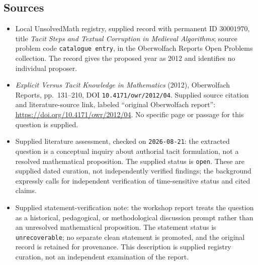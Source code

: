 \documentclass[11pt]{article}
\begin{document}
\subsection{Sources}
\begin{itemize}
\item Local UnsolvedMath registry, supplied record with permanent ID \(30001970\), title \emph{Tacit Steps and Textual Corruption in Medieval Algorithms}; source problem code \texttt{catalogue entry}, in the Oberwolfach Reports Open Problems collection. The record gives the proposed year as 2012 and identifies no individual proposer.
\item \emph{Explicit Versus Tacit Knowledge in Mathematics} (2012), Oberwolfach Reports, pp.\ 131--210, DOI \texttt{10.4171/owr/2012/04}. Supplied source citation and literature-source link, labeled ``original Oberwolfach report'': \url{https://doi.org/10.4171/owr/2012/04}. No specific page or passage for this question is supplied.
\item Supplied literature assessment, checked on \texttt{2026-08-21}: the extracted question is a conceptual inquiry about authorial tacit formulation, not a resolved mathematical proposition. The supplied status is \texttt{open}. These are supplied dated curation, not independently verified findings; the background expressly calls for independent verification of time-sensitive status and cited claims.
\item Supplied statement-verification note: the workshop report treats the question as a historical, pedagogical, or methodological discussion prompt rather than an unresolved mathematical proposition. The statement status is \texttt{unrecoverable}; no separate clean statement is promoted, and the original record is retained for provenance. This description is supplied registry curation, not an independent examination of the report.
\end{itemize}
\end{document}
